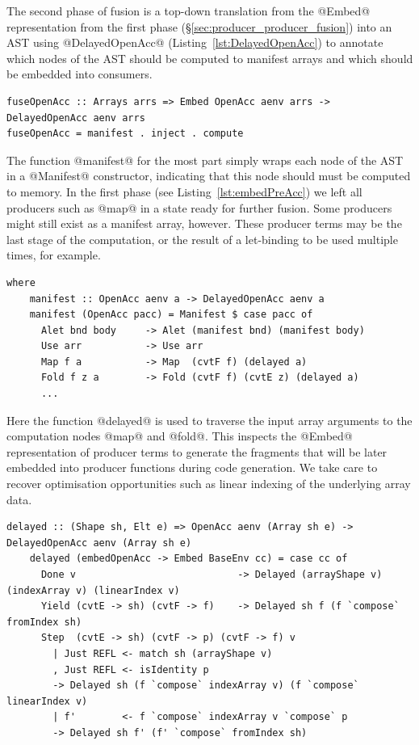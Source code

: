 The second phase of fusion is a top-down translation from the @Embed@
representation from the first phase (\S\ref{sec:producer_producer_fusion}) into
an AST using @DelayedOpenAcc@ (Listing~\ref{lst:DelayedOpenAcc}) to
annotate which nodes of the AST should be computed to manifest arrays and which
should be embedded into consumers.

\begin{lstlisting}[style=haskell
    ,name=fuseOpenAcc
    ,label=lst:fuseOpenAcc
    ,caption={[Consumer fusion via top-down knot-tying of the AST]}]
fuseOpenAcc :: Arrays arrs => Embed OpenAcc aenv arrs -> DelayedOpenAcc aenv arrs
fuseOpenAcc = manifest . inject . compute
\end{lstlisting}

The function @manifest@ for the most part simply wraps each node of the
AST in a @Manifest@ constructor, indicating
that this node should must be computed to memory. In the first phase (see
Listing~\ref{lst:embedPreAcc}) we left all producers such as @map@ in a
state ready for further fusion. Some producers might still exist as a manifest
array, however. These producer terms may be the last stage of the computation,
or the result of a let-binding to be used multiple times, for example.

\begin{lstlisting}[style=haskell,name=fuseOpenAcc]
  where
    manifest :: OpenAcc aenv a -> DelayedOpenAcc aenv a
    manifest (OpenAcc pacc) = Manifest $ case pacc of
      Alet bnd body     -> Alet (manifest bnd) (manifest body)
      Use arr           -> Use arr
      Map f a           -> Map  (cvtF f) (delayed a)
      Fold f z a        -> Fold (cvtF f) (cvtE z) (delayed a)
      ...
\end{lstlisting}

Here the function @delayed@ is used to traverse the input array arguments
to the computation nodes @map@ and @fold@. This inspects the
@Embed@ representation of producer terms to generate the fragments that
will be later embedded into producer functions during code generation. We take
care to recover optimisation opportunities such as linear indexing of the
underlying array data.

\begin{lstlisting}[style=haskell,name=fuseOpenAcc]
    delayed :: (Shape sh, Elt e) => OpenAcc aenv (Array sh e) -> DelayedOpenAcc aenv (Array sh e)
    delayed (embedOpenAcc -> Embed BaseEnv cc) = case cc of
      Done v                            -> Delayed (arrayShape v) (indexArray v) (linearIndex v)
      Yield (cvtE -> sh) (cvtF -> f)    -> Delayed sh f (f `compose` fromIndex sh)
      Step  (cvtE -> sh) (cvtF -> p) (cvtF -> f) v
        | Just REFL <- match sh (arrayShape v)
        , Just REFL <- isIdentity p
        -> Delayed sh (f `compose` indexArray v) (f `compose` linearIndex v)
        | f'        <- f `compose` indexArray v `compose` p
        -> Delayed sh f' (f' `compose` fromIndex sh)
\end{lstlisting}


